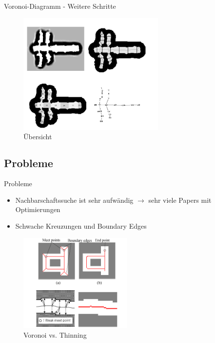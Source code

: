 \begin{frame}{Voronoi-Diagramm - Weitere Schritte}
 \begin{figure}[h]
 \centering
 \includegraphics[width=0.65\textwidth]{./material/complete.png}
 \caption{Übersicht \cite{Thrun1998}}
 \label{fig:gesamt}
\end{figure}
 
\end{frame}
\subsection{Probleme}
\begin{frame}{Probleme}
 \begin{itemize}
  \item Nachbarschaftssuche ist sehr aufwändig $\to$ sehr viele Papers mit Optimierungen
  \item Schwache Kreuzungen und Boundary Edges
 \end{itemize}
\begin{figure}[h]
 \centering
 \includegraphics[width=0.5\textwidth]{./material/thinningvsvoronoi.png}
 \caption{Voronoi vs. Thinning \cite{KoBangYun}}
 \label{fig:egal}
\end{figure}

 
\end{frame}
